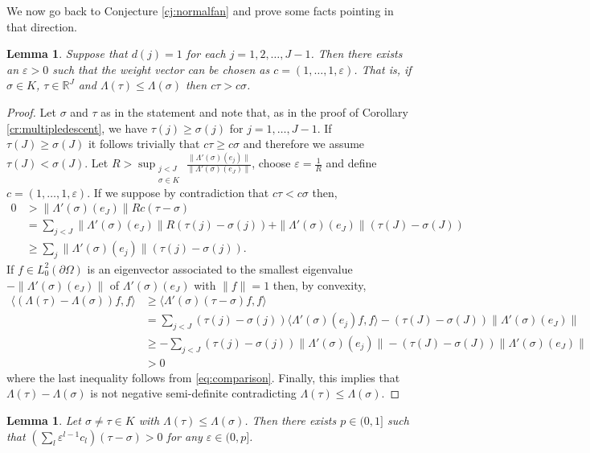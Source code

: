 \documentclass{article}
\newtheorem{lemma}[theorem]{Lemma}
\theoremstyle{definition}
\theoremstyle{remark}
\renewcommand{\leq}{\leqslant}
\renewcommand{\geq}{\geqslant}
\renewcommand{\epsilon}{\varepsilon}
\begin{document}
We now go back to Conjecture \ref{cj:normalfan} and prove some facts pointing in that direction.
\begin{lemma}
Suppose that $d(j)=1$ for each $j=1,2,\dots,J-1$.
Then there exists an $\epsilon > 0$ such that the weight vector can be chosen as $c = (1,\dots,1,\epsilon)$.
That is, if $\sigma\in K$, $\tau\in\mathbb R^J$ and $\Lambda(\tau)\leq\Lambda(\sigma)$ then $c\tau > c\sigma$.
\end{lemma}
\begin{proof}
Let $\sigma$ and $\tau$ as in the statement and note that, as in the proof of Corollary \ref{cr:multipledescent}, we have $\tau(j)\geq\sigma(j)$ for $j=1,\dots,J-1$.
If $\tau(J)\geq\sigma(J)$ it follows trivially that $c\tau\geq c\sigma$ and therefore we assume $\tau(J)<\sigma(J)$.
Let $\displaystyle R > \sup_{\substack{j<J\\ \sigma\in K}}\frac{\|\Lambda'(\sigma)(e_j)\|}{\|\Lambda'(\sigma)(e_J)\|}$, choose $\epsilon = \frac1R$ and define $c = (1,\dots,1,\epsilon)$.
If we suppose by contradiction that $c\tau<c\sigma$ then,
\begin{align}
0 &> \|\Lambda'(\sigma)(e_J)\|R c(\tau-\sigma) \nonumber\\
&= \sum_{j<J}\|\Lambda'(\sigma)(e_J)\| R (\tau(j)-\sigma(j))+ \|\Lambda'(\sigma)(e_J)\|(\tau(J)-\sigma(J)) \label{eq:comparison}\\
&\geq \sum_{j}\|\Lambda'(\sigma)(e_j)\|(\tau(j)-\sigma(j)) \nonumber.
\end{align}
If $f\in L^2_0(\partial\Omega)$ is an eigenvector associated to the smallest eigenvalue $-\|\Lambda'(\sigma)(e_J)\|$ of $\Lambda'(\sigma)(e_J)$ with $\|f\|=1$ then, by convexity,
\begin{align*}
\langle (\Lambda(\tau) - \Lambda(\sigma))f,f\rangle &\geq \langle \Lambda'(\sigma)(\tau-\sigma)f,f\rangle \\
&=\sum_{j < J}(\tau(j)-\sigma(j))\langle\Lambda'(\sigma)(e_j)f,f\rangle - (\tau(J)-\sigma(J))\|\Lambda'(\sigma)(e_J)\| \\
&\geq -\sum_{j < J}(\tau(j)-\sigma(j))\|\Lambda'(\sigma)(e_j)\| - (\tau(J)-\sigma(J))\|\Lambda'(\sigma)(e_J)\| \\
&>0
\end{align*}
where the last inequality follows from \eqref{eq:comparison}.
Finally, this implies that $\Lambda(\tau)-\Lambda(\sigma)$ is not negative semi-definite contradicting $\Lambda(\tau)\leq\Lambda(\sigma)$.
\end{proof}
\begin{lemma}\label{lm:existence}
Let $\sigma\neq\tau\in K$ with $\Lambda(\tau)\leq\Lambda(\sigma)$.
Then there exists $p\in(0,1]$ such that $ \left(\sum_l \epsilon^{l-1}c_l\right) (\tau-\sigma) >0 $ for any $\epsilon\in(0,p]$.
\end{lemma}
\end{document}
